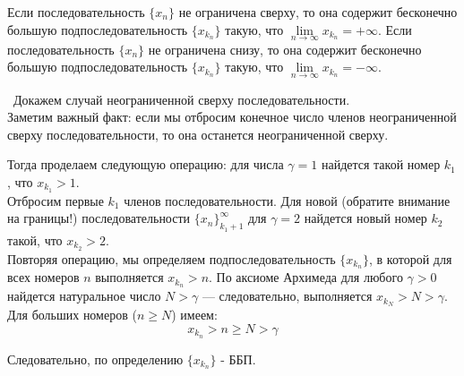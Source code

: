 \begin{theorem}
Если последовательность \(\{x_{n}\}\) не ограничена сверху, то она содержит
бесконечно большую подпоследовательность \(\{x_{k_{n}}\}\) такую, что
\(\lim\limits_{n \to \infty}{x_{k_{n}}} = +\infty\).
Если последовательность \(\{x_{n}\}\) не ограничена снизу, то она содержит
бесконечно большую подпоследовательность \(\{x_{k_{n}}\}\) такую, что
\(\lim\limits_{n \to \infty}{x_{k_{n}}}= -\infty\).

\vspace{3mm}

\proofname~Докажем случай неограниченной сверху последовательности.\\
\indent Заметим важный факт: если мы отбросим конечное число членов неограниченной
сверху последовательности, то она останется неограниченной сверху.

Тогда проделаем следующую операцию: для числа \(\gamma=1\) найдется такой
номер \(k_{1}\), что \(x_{k_{1}} > 1.\) \\
    
\indent Отбросим первые \(k_{1}\) членов последовательности. Для новой 
(обратите внимание на границы!) последовательности \(\{x_{n}\}^{\infty}_{k_{1} + 1}\) 
для \(\gamma=2\) найдется новый номер \(k_{2}\) такой, что \(x_{k_{2}} > 2\). \\

Повторяя операцию, мы определяем подпоследовательность \(\{x_{k_{n}}\}\),
в которой для всех номеров \(n\) выполняется \(x_{k_{n}} > n\).
По аксиоме Архимеда для любого \(\gamma > 0\) найдется натуральное число \(N > \gamma\) --- 
следовательно, выполняется \(x_{k_{N}} > N > \gamma\). Для больших номеров (\(n \geq N\)) имеем:
\[
x_{k_{n}} > n \geq N > \gamma
\]

Следовательно, по определению \(\{x_{k_{n}}\}\) - ББП.~\qedsymbol
\end{theorem}


